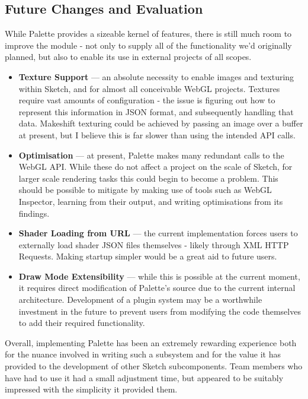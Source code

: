 \documentclass{l3proj}
\begin{document}
\subsection{Future Changes and Evaluation}
\label{arch-shad-future}
While Palette provides a sizeable kernel of features, there is still much room to improve the module - not only to supply all of the functionality we'd originally planned, but also to enable its use in external projects of all scopes.
\begin{itemize}
\item \textbf{Texture Support} --- an absolute necessity to enable images and texturing within Sketch, and for almost all conceivable WebGL projects. Textures require vast amounts of configuration - the issue is figuring out how to represent this information in JSON format, and subsequently handling that data. Makeshift texturing could be achieved by passing an image over a buffer at present, but I believe this is far slower than using the intended API calls. 
\item \textbf{Optimisation} --- at present, Palette makes many redundant calls to the WebGL API. While these do not affect a project on the scale of Sketch, for larger scale rendering tasks this could begin to become a problem. This should be possible to mitigate by making use of tools such as WebGL Inspector, learning from their output, and writing optimisations from its findings.
\item \textbf{Shader Loading from URL} --- the current implementation forces users to externally load shader JSON files themselves - likely through XML HTTP Requests. Making startup simpler would be a great aid to future users.
\item \textbf{Draw Mode Extensibility} --- while this is possible at the current moment, it requires direct modification of Palette's source due to the current internal architecture. Development of a plugin system may be a worthwhile investment in the future to prevent users from modifying the code themselves to add their required functionality.
\end{itemize}

Overall, implementing Palette has been an extremely rewarding experience both for the nuance involved in writing such a subsystem and for the value it has provided to the development of other Sketch subcomponents. Team members who have had to use it had a small adjustment time, but appeared to be suitably impressed with the simplicity it provided them.
\end{document}
